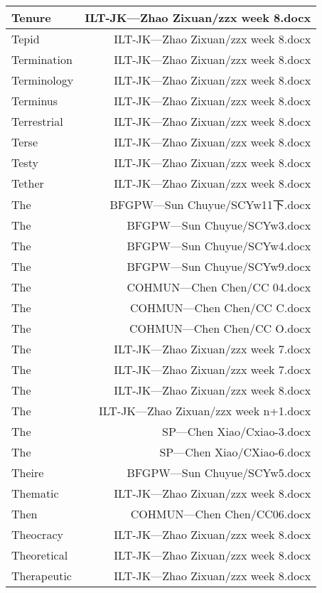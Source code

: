 \documentclass{article}
\begin{document}
\begin{center}
\begin{longtable}{|l|r|}
\hline
Tenure  &  ILT-JK---Zhao Zixuan/zzx week 8.docx\\  
\hline
Tepid  &  ILT-JK---Zhao Zixuan/zzx week 8.docx\\  
\hline
Termination  &  ILT-JK---Zhao Zixuan/zzx week 8.docx\\  
\hline
Terminology  &  ILT-JK---Zhao Zixuan/zzx week 8.docx\\  
\hline
Terminus  &  ILT-JK---Zhao Zixuan/zzx week 8.docx\\  
\hline
Terrestrial  &  ILT-JK---Zhao Zixuan/zzx week 8.docx\\  
\hline
Terse  &  ILT-JK---Zhao Zixuan/zzx week 8.docx\\  
\hline
Testy  &  ILT-JK---Zhao Zixuan/zzx week 8.docx\\  
\hline
Tether  &  ILT-JK---Zhao Zixuan/zzx week 8.docx\\  
\hline
The  &  BFGPW---Sun Chuyue/SCYw11下.docx\\  
\hline
The  &  BFGPW---Sun Chuyue/SCYw3.docx\\  
\hline
The  &  BFGPW---Sun Chuyue/SCYw4.docx\\  
\hline
The  &  BFGPW---Sun Chuyue/SCYw9.docx\\  
\hline
The  &  COHMUN---Chen Chen/CC 04.docx\\  
\hline
The  &  COHMUN---Chen Chen/CC C.docx\\  
\hline
The  &  COHMUN---Chen Chen/CC O.docx\\  
\hline
The  &  ILT-JK---Zhao Zixuan/zzx week 7.docx\\  
\hline
The  &  ILT-JK---Zhao Zixuan/zzx week 7.docx\\  
\hline
The  &  ILT-JK---Zhao Zixuan/zzx week 8.docx\\  
\hline
The  &  ILT-JK---Zhao Zixuan/zzx week n+1.docx\\  
\hline
The  &  SP---Chen Xiao/Cxiao-3.docx\\  
\hline
The  &  SP---Chen Xiao/CXiao-6.docx\\  
\hline
Theire  &  BFGPW---Sun Chuyue/SCYw5.docx\\  
\hline
Thematic  &  ILT-JK---Zhao Zixuan/zzx week 8.docx\\  
\hline
Then  &  COHMUN---Chen Chen/CC06.docx\\  
\hline
Theocracy  &  ILT-JK---Zhao Zixuan/zzx week 8.docx\\  
\hline
Theoretical  &  ILT-JK---Zhao Zixuan/zzx week 8.docx\\  
\hline
Therapeutic  &  ILT-JK---Zhao Zixuan/zzx week 8.docx\\  

\end{longtable}
\end{center}
\end{document}

